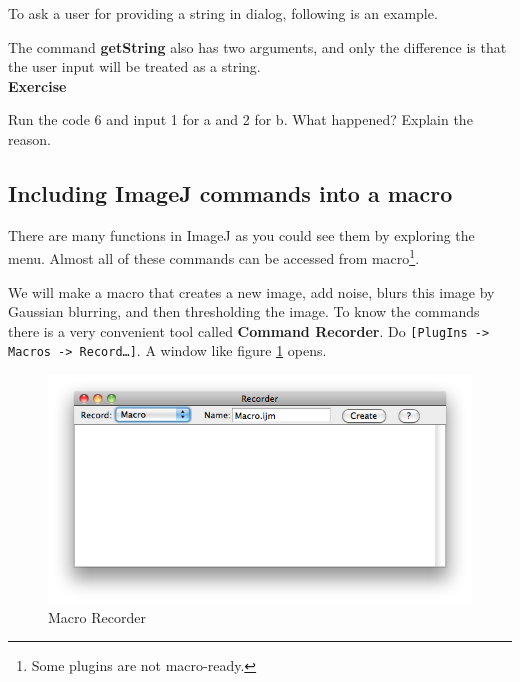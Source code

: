 \documentclass[11pt,a4paper,oneside]{report}
\newenvironment{indentexercise}[1]%
{{\setlength{\leftmargin}{2em}}%
\textbf{Exercise \thesubsection-#1}%
\begin{list}{}%
	\item%
}
{\end{list}}
\newcommand{\ijmenu}[1]{\texttt{\small#1}}
\begin{document}
To ask a user for providing a string in dialog, following is an example. 


The command \textbf{getString} also has two arguments, 
and only the difference is that the user input will be treated as a string. \\

\begin{indentexercise}{1}
Run the code 6 and input 1 for a and 2 for b. What happened? Explain the reason. 
\end{indentexercise}

\subsection{Including ImageJ commands into a macro}
There are many functions in ImageJ as you could see them by exploring the menu.
Almost all of these commands can be accessed from macro\footnote{Some plugins
are not macro-ready.}.

We will make a macro that creates a new image, add noise, blurs this image by
Gaussian blurring, and then thresholding the image. To know the commands 
there is a very convenient tool called \textbf{Command Recorder}. 
Do \ijmenu{[PlugIns -> Macros -> Record\ldots]}. A window like figure
\ref{fig_macroRecorderBlank} opens.

\begin{figure}[htbp]
\begin{center}
\includegraphics[scale=0.6]{fig/MacroRecorderBlank.png}
\caption{Macro Recorder} \label{fig_macroRecorderBlank}
\end{center}
\end{figure}
\end{document}
